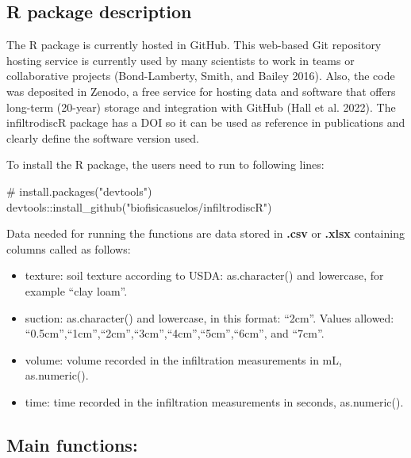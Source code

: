 \documentclass[
]{article}
\newenvironment{Shaded}{\begin{snugshade}}{\end{snugshade}}
\newcommand{\CommentTok}[1]{\textcolor[rgb]{0.37,0.37,0.37}{#1}}
\newcommand{\FunctionTok}[1]{\textcolor[rgb]{0.28,0.35,0.67}{#1}}
\newcommand{\NormalTok}[1]{\textcolor[rgb]{0.00,0.23,0.31}{#1}}
\newcommand{\SpecialCharTok}[1]{\textcolor[rgb]{0.37,0.37,0.37}{#1}}
\newcommand{\StringTok}[1]{\textcolor[rgb]{0.13,0.47,0.30}{#1}}
\providecommand{\tightlist}{%
  \setlength{\itemsep}{0pt}\setlength{\parskip}{0pt}}\usepackage{longtable,booktabs,array}
\begin{document}
\hypertarget{r-package-description}{%
\subsection{R package description}\label{r-package-description}}

The R package is currently hosted in GitHub. This web-based Git
repository hosting service is currently used by many scientists to work
in teams or collaborative projects (Bond-Lamberty, Smith, and Bailey
2016). Also, the code was deposited in Zenodo, a free service for
hosting data and software that offers long-term (20-year) storage and
integration with GitHub (Hall et al. 2022). The infiltrodiscR package
has a DOI so it can be used as reference in publications and clearly
define the software version used.

To install the R package, the users need to run to following lines:

\begin{Shaded}
\begin{Highlighting}[]
\CommentTok{\# install.packages("devtools")}
\NormalTok{devtools}\SpecialCharTok{::}\FunctionTok{install\_github}\NormalTok{(}\StringTok{"biofisicasuelos/infiltrodiscR"}\NormalTok{)}
\end{Highlighting}
\end{Shaded}

Data needed for running the functions are data stored in \textbf{.csv}
or \textbf{.xlsx} containing columns called as follows:

\begin{itemize}
\tightlist
\item
  texture: soil texture according to USDA: as.character() and lowercase,
  for example ``clay loam''.
\item
  suction: as.character() and lowercase, in this format: ``2cm''. Values
  allowed: ``0.5cm'',``1cm'',``2cm'',``3cm'',``4cm'',``5cm'',``6cm'',
  and ``7cm''.
\item
  volume: volume recorded in the infiltration measurements in mL,
  as.numeric().
\item
  time: time recorded in the infiltration measurements in seconds,
  as.numeric().
\end{itemize}

\hypertarget{main-functions}{%
\subsection{Main functions:}\label{main-functions}}
\end{document}
